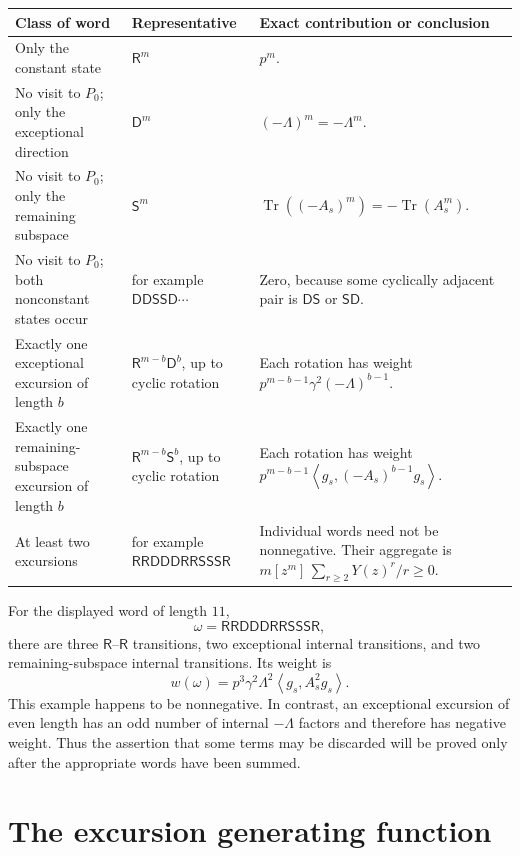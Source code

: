\documentclass[11pt]{article}
\newcommand{\R}{\mathsf R}
\newcommand{\D}{\mathsf D}
\newcommand{\Ssafe}{\mathsf S}
\newcommand{\Tr}{\operatorname{Tr}}
\newcommand{\ip}[2]{\left\langle #1,#2\right\rangle}
\newcommand{\coeff}[2]{[z^{#1}]\,#2}
\begin{document}
\begin{center}
\renewcommand{\arraystretch}{1.25}
\begin{tabularx}{\textwidth}{@{}>{\raggedright\arraybackslash}p{}
  >{\raggedright\arraybackslash}p{}X@{}}
\toprule
Class of word & Representative & Exact contribution or conclusion\\
\midrule
Only the constant state
  & $\R^m$
  & $p^m$.\\
No visit to $P_0$; only the exceptional direction
  & $\D^m$
  & $(-\Lambda)^m=-\Lambda^m$.\\
No visit to $P_0$; only the remaining subspace
  & $\Ssafe^m$
  & $\Tr((-A_s)^m)=-\Tr(A_s^m)$.\\
No visit to $P_0$; both nonconstant states occur
  & for example $\D\D\Ssafe\Ssafe\D\cdots$
  & Zero, because some cyclically adjacent pair is $\D\Ssafe$ or
    $\Ssafe\D$.\\
Exactly one exceptional excursion of length $b$
  & $\R^{m-b}\D^b$, up to cyclic rotation
  & Each rotation has weight
    $p^{m-b-1}\gamma^2(-\Lambda)^{b-1}$.\\
Exactly one remaining-subspace excursion of length $b$
  & $\R^{m-b}\Ssafe^b$, up to cyclic rotation
  & Each rotation has weight
    $p^{m-b-1}\ip{g_s}{(-A_s)^{b-1}g_s}$.\\
At least two excursions
  & for example $\R\R\D\D\D\R\R\Ssafe\Ssafe\Ssafe\R$
  & Individual words need not be nonnegative.  Their aggregate is
    $m\coeff{m}{\sum_{r\ge 2} Y(z)^r/r}\geq0$.\\
\bottomrule
\end{tabularx}
\end{center}

For the displayed word of length $11$,
\[
  \omega=\R\R\D\D\D\R\R\Ssafe\Ssafe\Ssafe\R,
\]
there are three $\R$--$\R$ transitions, two exceptional internal
transitions, and two remaining-subspace internal transitions.  Its weight is
\[
  w(\omega)
  =p^3\gamma^2\Lambda^2\ip{g_s}{A_s^2g_s}.
  \tag{2.4}
\]
This example happens to be nonnegative.  In contrast, an exceptional
excursion of even length has an odd number of internal $-\Lambda$ factors and
therefore has negative weight.  Thus the assertion that some terms may be
discarded will be proved only after the appropriate words have been summed.

\section{The excursion generating function}
\end{document}
